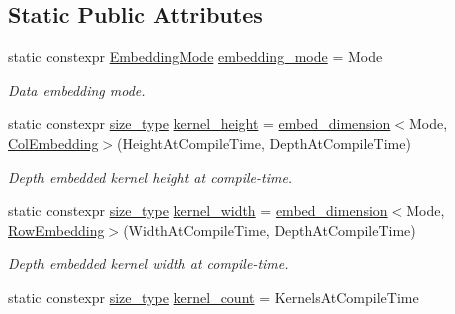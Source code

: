 \subsection*{Static Public Attributes}
\begin{DoxyCompactItemize}
\item 
static constexpr \hyperlink{namespaceffnn_1_1layer_1_1convolution_ad420d4eb8edd7c254d1f0aaaad81017f}{Embedding\-Mode} \hyperlink{structffnn_1_1layer_1_1convolution_1_1filter__traits_af84215067c426f2a9bb8c6fd4bd87363}{embedding\-\_\-mode} = Mode
\begin{DoxyCompactList}\small\item\em Data embedding mode. \end{DoxyCompactList}\item 
static constexpr \hyperlink{namespaceffnn_a63b90a2fd70eb76684eac482a51633e5}{size\-\_\-type} \hyperlink{structffnn_1_1layer_1_1convolution_1_1filter__traits_a9d152e933408a27b106afc8b413a6132}{kernel\-\_\-height} = \hyperlink{namespaceffnn_1_1layer_1_1convolution_a0cca23056b3d9d79e6604c9419814351}{embed\-\_\-dimension}$<$Mode, \hyperlink{namespaceffnn_1_1layer_1_1convolution_ad420d4eb8edd7c254d1f0aaaad81017fae2ba27e8fa1aed3f003e54947f37d17e}{Col\-Embedding}$>$(Height\-At\-Compile\-Time, Depth\-At\-Compile\-Time)
\begin{DoxyCompactList}\small\item\em Depth embedded kernel height at compile-\/time. \end{DoxyCompactList}\item 
static constexpr \hyperlink{namespaceffnn_a63b90a2fd70eb76684eac482a51633e5}{size\-\_\-type} \hyperlink{structffnn_1_1layer_1_1convolution_1_1filter__traits_adcec5284173f864350dc21be87ed9f1a}{kernel\-\_\-width} = \hyperlink{namespaceffnn_1_1layer_1_1convolution_a0cca23056b3d9d79e6604c9419814351}{embed\-\_\-dimension}$<$Mode, \hyperlink{namespaceffnn_1_1layer_1_1convolution_ad420d4eb8edd7c254d1f0aaaad81017fa1c03b5145e31615496457aa687a180c2}{Row\-Embedding}$>$(Width\-At\-Compile\-Time, Depth\-At\-Compile\-Time)
\begin{DoxyCompactList}\small\item\em Depth embedded kernel width at compile-\/time. \end{DoxyCompactList}\item 
static constexpr \hyperlink{namespaceffnn_a63b90a2fd70eb76684eac482a51633e5}{size\-\_\-type} \hyperlink{structffnn_1_1layer_1_1convolution_1_1filter__traits_a16246d9d3f33c752ca20d6f53a469f9a}{kernel\-\_\-count} = Kernels\-At\-Compile\-Time

\end{DoxyCompactItemize}

